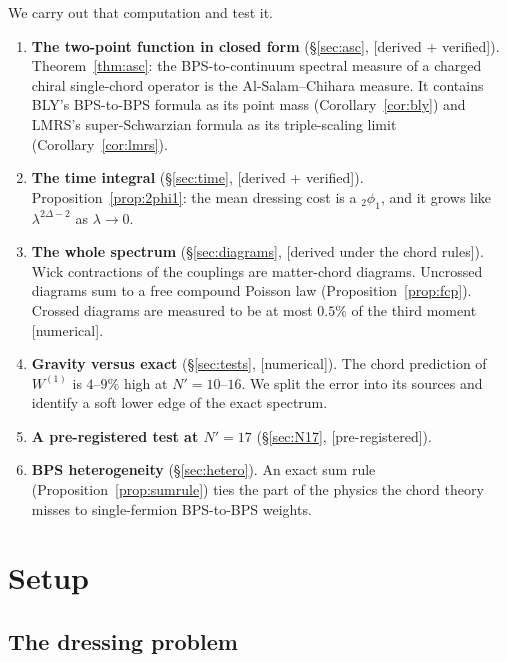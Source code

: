\documentclass[11pt]{article}
\newcommand{\Np}{N'}
\newcommand{\Wone}{W^{(1)}}
\newcommand{\tagbox}[2]{\textsf{\small\color{#1}[#2]}}
\newcommand{\VER}{\tagbox{cder}{derived + verified}}
\newcommand{\NUM}{\tagbox{cnum}{numerical}}
\newcommand{\PRE}{\tagbox{cnum}{pre-registered}}
\newcommand{\COND}{\tagbox{cconj}{derived under the chord rules}}
\theoremstyle{plain}
\theoremstyle{remark}
\numberwithin{equation}{section}
\begin{document}
We carry out that computation and test it.
\begin{enumerate}\itemsep2pt
\item \textbf{The two-point function in closed form} (\S\ref{sec:asc}, \VER). Theorem~\ref{thm:asc}: the BPS-to-continuum
  spectral measure of a charged chiral single-chord operator is the Al-Salam--Chihara measure. It contains BLY's
  BPS-to-BPS formula as its point mass (Corollary~\ref{cor:bly}) and LMRS's super-Schwarzian formula as its
  triple-scaling limit (Corollary~\ref{cor:lmrs}).
\item \textbf{The time integral} (\S\ref{sec:time}, \VER). Proposition~\ref{prop:2phi1}: the mean dressing cost is a
  ${}_2\phi_1$, and it grows like $\lambda^{2\Delta-2}$ as $\lambda\to0$.
\item \textbf{The whole spectrum} (\S\ref{sec:diagrams}, \COND). Wick contractions of the couplings are matter-chord
  diagrams. Uncrossed diagrams sum to a free compound Poisson law (Proposition~\ref{prop:fcp}). Crossed diagrams are
  measured to be at most $0.5\%$ of the third moment \NUM.
\item \textbf{Gravity versus exact} (\S\ref{sec:tests}, \NUM). The chord prediction of $\Wone$ is $4$--$9\%$ high at
  $\Np=10$--$16$. We split the error into its sources and identify a soft lower edge of the exact spectrum.
\item \textbf{A pre-registered test at $\Np=17$} (\S\ref{sec:N17}, \PRE).
\item \textbf{BPS heterogeneity} (\S\ref{sec:hetero}). An exact sum rule (Proposition~\ref{prop:sumrule}) ties the
  part of the physics the chord theory misses to single-fermion BPS-to-BPS weights.
\end{enumerate}

\section{Setup}\label{sec:setup}

\subsection{The dressing problem}
\end{document}
